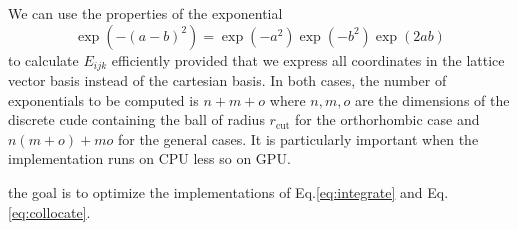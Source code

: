 \documentclass{article}
\begin{document}
We can use the properties of the exponential $$\exp(-\left( a-b \right)^2) =
\exp\left( -a^2\right) \exp\left( -b^2\right) \exp \left( 2 ab \right)$$ to
calculate $E_{ijk}$ efficiently provided that we express all coordinates in the
lattice vector basis instead of the cartesian basis. In both cases, the number
of exponentials to be computed is $n + m + o$ where $n,m,o$ are the dimensions
of the discrete cude containing the ball of radius $r_{\textrm{cut}}$ for the
orthorhombic case and $n (m + o) + m o$ for the general cases. It is
particularly important when the implementation runs on CPU less so on GPU.

the goal is to optimize the implementations of Eq.\ref{eq:integrate} and
Eq.\ref{eq:collocate}.
\end{document}
